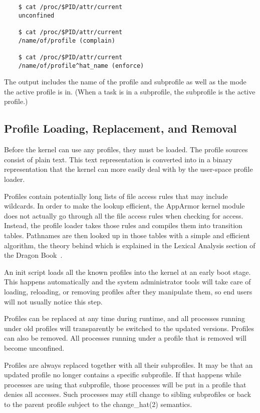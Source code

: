 \documentclass[a4paper]{article}
\begin{document}
\begin{small}
\begin{verbatim}
    $ cat /proc/$PID/attr/current
    unconfined

    $ cat /proc/$PID/attr/current
    /name/of/profile (complain)

    $ cat /proc/$PID/attr/current
    /name/of/profile^hat_name (enforce)
\end{verbatim}
\end{small}

The output includes the name of the profile and subprofile as well as
the mode the active profile is in.  (When a task is in a subprofile,
the subprofile is the active profile.)

\subsection{Profile Loading, Replacement, and Removal}

Before the kernel can use any profiles, they must be loaded.  The
profile sources consist of plain text.  This text representation is
converted into in a binary representation that the kernel can more
easily deal with by the user-space profile loader.

Profiles contain potentially long lists of file access rules that may
include wildcards.  In order to make the lookup efficient, the AppArmor
kernel module does not actually go through all the file access rules
when checking for access.  Instead, the profile loader takes those rules
and compiles them into transition tables.  Pathnames are then looked up
in those tables with a simple and efficient algorithm, the theory behind
which is explained in the Lexical Analysis section of the Dragon
Book~\cite{dragon86}.

An init script loads all the known profiles into the kernel at an early
boot stage.  This happens automatically and the system administrator
tools will take care of loading, reloading, or removing profiles after
they manipulate them, so end users will not usually notice this step.

Profiles can be replaced at any time during runtime, and all processes
running under old profiles will transparently be switched to the updated
versions.  Profiles can also be removed.  All processes running under a
profile that is removed will become unconfined.

Profiles are always replaced together with all their subprofiles.  It
may be that an updated profile no longer contains a specific subprofile.
If that happens while processes are using that subprofile, those
processes will be put in a profile that denies all accesses.  Such
processes may still change to sibling subprofiles or back to the parent
profile subject to the change\_hat(2) semantics.
\end{document}
